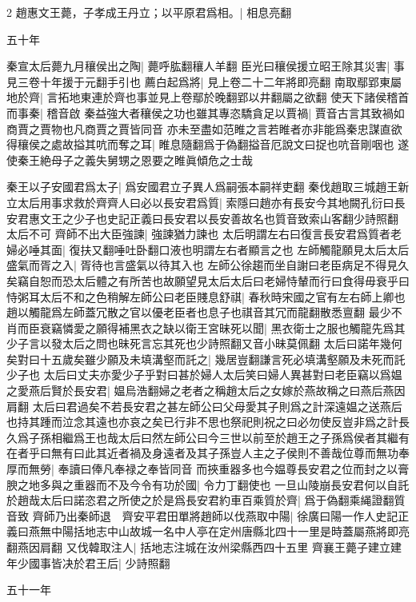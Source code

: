 2 趙惠文王薨，子孝成王丹立；以平原君爲相。|{
	相息亮翻
	}


五十年

秦宣太后薨九月穰侯出之陶|{
	薨呼肱翻穰人羊翻}
臣光曰穰侯援立昭王除其災害|{
	事見三卷十年援于元翻手引也}
薦白起爲將|{
	見上卷二十二年將即亮翻}
南取鄢郢東屬地於齊|{
	言拓地東連於齊也事並見上卷鄢於晚翻郢以井翻屬之欲翻}
使天下諸侯稽首而事秦|{
	稽音啟}
秦益強大者穰侯之功也雖其專恣驕貪足以賈禍|{
	賈音古言其致禍如商賈之賈物也凡商賈之賈皆同音}
亦未至盡如范睢之言若睢者亦非能爲秦忠謀直欲得穰侯之處故搤其吭而奪之耳|{
	睢息隨翻爲于偽翻搤音厄說文曰捉也吭音剛咽也}
遂使秦王絶母子之義失舅甥之恩要之睢眞傾危之士哉

秦王以子安國君爲太子|{
	爲安國君立子異人爲嗣張本嗣祥吏翻}
秦伐趙取三城趙王新立太后用事求救於齊齊人曰必以長安君爲質|{
	索隱曰趙亦有長安今其地闕孔衍曰長安君惠文王之少子也史記正義曰長安君以長安善故名也質音致索山客翻少詩照翻}
太后不可
齊師不出大臣強諫|{
	強諫猶力諫也}
太后明謂左右曰復言長安君爲質者老婦必唾其面|{
	復扶又翻唾吐卧翻口液也明謂左右者顯言之也}
左師觸龍願見太后太后盛氣而胥之入|{
	胥待也言盛氣以待其入也}
左師公徐趨而坐自謝曰老臣病足不得見久矣竊自恕而恐太后體之有所苦也故願望見太后太后曰老婦恃輦而行曰食得毋衰乎曰恃粥耳太后不和之色稍解左師公曰老臣賤息舒祺|{
	春秋時宋國之官有左右師上卿也趙以觸龍爲左師蓋冗散之官以優老臣者也息子也祺音其冗而龍翻散悉亶翻}
最少不肖而臣衰竊憐愛之願得補黑衣之缺以衛王宮昧死以聞|{
	黑衣衛士之服也觸龍先爲其少子言以發太后之問也昧死言忘其死也少詩照翻又音小昧莫佩翻}
太后曰諾年幾何矣對曰十五歲矣雖少願及未填溝壑而託之|{
	幾居豈翻謙言死必填溝壑願及未死而託少子也}
太后曰丈夫亦愛少子乎對曰甚於婦人太后笑曰婦人異甚對曰老臣竊以爲媪之愛燕后賢於長安君|{
	媪烏浩翻婦之老者之稱趙太后之女嫁於燕故稱之曰燕后燕因肩翻}
太后曰君過矣不若長安君之甚左師公曰父母愛其子則爲之計深遠媪之送燕后也持其踵而泣念其遠也亦哀之矣已行非不思也祭祀則祝之曰必勿使反豈非爲之計長久爲子孫相繼爲王也哉太后曰然左師公曰今三世以前至於趙王之子孫爲侯者其繼有在者乎曰無有曰此其近者禍及身遠者及其子孫豈人主之子侯則不善哉位尊而無功奉厚而無勞|{
	奉讀曰俸凡奉禄之奉皆同音}
而挾重器多也今媪尊長安君之位而封之以膏腴之地多與之重器而不及今令有功於國|{
	令力丁翻使也}
一旦山陵崩長安君何以自託於趙哉太后曰諾恣君之所使之於是爲長安君約車百乘質於齊|{
	爲于偽翻乘䋲證翻質音致}
齊師乃出秦師退　齊安平君田單將趙師以伐燕取中陽|{
	徐廣曰陽一作人史記正義曰燕無中陽括地志中山故城一名中人亭在定州唐縣北四十一里是時蓋屬燕將即亮翻燕因肩翻}
又伐韓取注人|{
	括地志注城在汝州梁縣西四十五里}
齊襄王薨子建立建年少國事皆决於君王后|{
	少詩照翻}


五十一年


